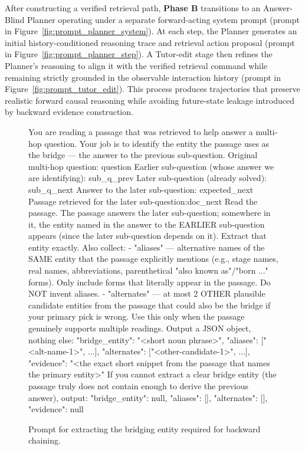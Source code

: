 \documentclass{article} %
\begin{document}
After constructing a verified retrieval path, \textbf{Phase B} transitions to an Answer-Blind Planner operating under a separate forward-acting system prompt (prompt in Figure~\ref{fig:prompt_planner_system}). At each step, the Planner generates an initial history-conditioned reasoning trace and retrieval action proposal (prompt in Figure~\ref{fig:prompt_planner_step}). A Tutor-edit stage then refines the Planner's reasoning to align it with the verified retrieval command while remaining strictly grounded in the observable interaction history (prompt in Figure~\ref{fig:prompt_tutor_edit}). This process produces trajectories that preserve realistic forward causal reasoning while avoiding future-state leakage introduced by backward evidence construction.







\begin{figure}[!t]
\begin{promptbox}
You are reading a passage that was retrieved to help answer a multi-hop question. Your job is to identify the entity the passage uses as the bridge — the answer to the previous sub-question.
Original multi-hop question: {question}
Earlier sub-question (whose answer we are identifying): {sub_q_prev}
Later sub-question (already solved): {sub_q_next}
Answer to the later sub-question: {expected_next}
Passage retrieved for the later sub-question:{doc_next}
Read the passage. The passage answers the later sub-question; somewhere in it, the entity named in the answer to the EARLIER sub-question appears (since the later sub-question depends on it). Extract that entity exactly.
Also collect:
- "aliases" — alternative names of the SAME entity that the passage explicitly mentions (e.g., stage names, real names, abbreviations, parenthetical "also known as"/"born ..." forms). Only include forms that literally appear in the passage. Do NOT invent aliases.
- "alternates" — at most 2 OTHER plausible candidate entities from the passage that could also be the bridge if your primary pick is wrong. Use this only when the passage genuinely supports multiple readings.
Output a JSON object, nothing else: {{"bridge_entity": "<short noun phrase>", "aliases": ["<alt-name-1>", ...], "alternates": ["<other-candidate-1>", ...], "evidence": "<the exact short snippet from the passage that names the primary entity>"}}
If you cannot extract a clear bridge entity (the passage truly does not contain enough to derive the previous answer), output:
{{"bridge_entity": null, "aliases": [], "alternates": [], "evidence": null}}
\end{promptbox}
\vspace{-0.4cm}
\caption{Prompt for extracting the bridging entity required for backward chaining.}
\label{fig:prompt_bridge_extraction}
\end{figure}
\end{document}
